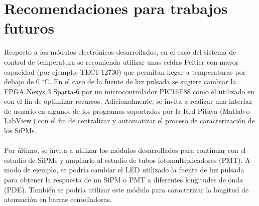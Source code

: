 \chapter{Recomendaciones para trabajos futuros}
\label{Cap:Recomendaciones}
Respecto a los módulos electrónicos desarrollados, en el caso del sistema de control de temperatura se recomienda utilizar unas celdas Peltier con mayor capacidad (por ejemplo: TEC1-12730) que permitan llegar a temperaturas por debajo de 0 $^\circ$C. En el caso de la fuente de luz pulsada se sugiere cambiar la FPGA Nexys 3 Sparta-6 por un microcontrolador PIC16F88 como el utilizado en \citep{Deisgn_LED_driver} con el fin de optimizar recursos. Adicionalmente, se invita  a realizar una interfaz de usuario en algunos de los programas soportados por la Red Pitaya (Matlab\textsuperscript \textregistered $~$o LabView\textsuperscript \textregistered $~$) con el fin de centralizar y automatizar el proceso de caracterización de los SiPMs.\\ \\
Por último, se invita a utilizar los módulos desarrollados para continuar con el estudio de SiPMs y ampliarlo al estudio de tubos fotomultiplicadores (PMT). A modo de ejemplo, se podría cambiar el LED utilizado la fuente de luz pulsada para obtener la respuesta de un SiPM o PMT a diferentes longitudes de onda (PDE). También se podría utilizar este módulo para caracterizar la longitud de atenuación en barras centelladoras.

